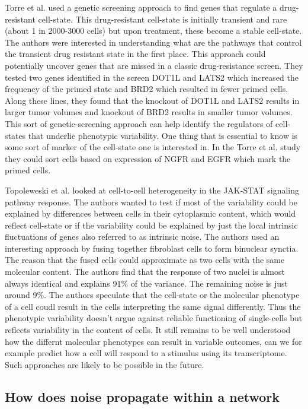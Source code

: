 Torre et al. \cite{Torre} used a genetic screening approach to find genes that regulate a drug-resistant cell-state. This drug-resistant cell-state is initially transient and rare (about 1 in 2000-3000 cells) but upon treatment, these become a stable cell-state.  The authors were interested in understanding what are the pathways that control the transient drug resistant state in the first place. This approach could potentially uncover genes that are missed in a classic drug-resistance screen. They tested two genes identified in the screen DOT1L and LATS2 which increased the frequency of the primed state and BRD2 which resulted in fewer primed cells. Along these lines, they found that the knockout of DOT1L and LATS2 results in larger tumor volumes and knockout of BRD2 results in smaller tumor volumes. This sort of genetic-screening approach can help identify the regulators of cell-states that underlie phenotypic variability. One thing that is essential to know is some sort of marker of the cell-state one is interested in. In the Torre et al. study they could sort cells based on expression of NGFR and EGFR which mark the primed cells.

Topoleweski et al. \cite{topolewski2022ssb} looked at cell-to-cell heterogeneity in the JAK-STAT signaling pathway response. The authors wanted to test if most of the variability could be explained by differences between cells in their cytoplasmic content, which would reflect cell-state or if the variability could be explained by just the local intrinsic fluctuations of genes also referred to as intrinsic noise. The authors used an interesting approach by fusing together fibroblast cells to form binuclear synctia. The reason that the fused cells could approximate as two cells with the same molecular content. The authors find that the response of two nuclei is almost always identical and explains 91\% of the variance. The remaining noise is just around 9\%. The authors speculate that the cell-state or the molecular phenotype of a cell coudl result in the cells interpreting the same signal differently. Thus the phenotypic variability doesn't argue against reliable functioning of single-cells but reflects variability in the content of cells. It still remains to be well understood how the differnt molecular phenotypes can result in variable outcomes, can we for example predict how a cell will respond to a stimulus using its transcriptome. Such approaches are likely to be possible in the future.

\subsection{ How does noise propagate within a network}

